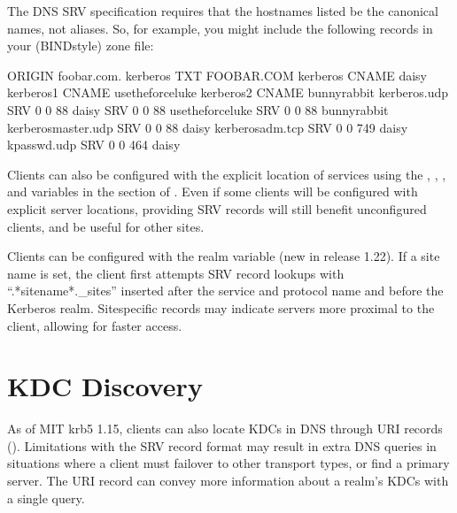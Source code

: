 \documentclass[letterpaper,10pt,english]{sphinxmanual}
\begin{document}
\sphinxAtStartPar
The DNS SRV specification requires that the hostnames listed be the
canonical names, not aliases.  So, for example, you might include the
following records in your (BIND\sphinxhyphen{}style) zone file:

\begin{sphinxVerbatim}[commandchars=\\\{\}]
\PYGZdl{}ORIGIN foobar.com.
\PYGZus{}kerberos               TXT       \PYGZdq{}FOOBAR.COM\PYGZdq{}
kerberos                CNAME     daisy
kerberos\PYGZhy{}1              CNAME     use\PYGZhy{}the\PYGZhy{}force\PYGZhy{}luke
kerberos\PYGZhy{}2              CNAME     bunny\PYGZhy{}rabbit
\PYGZus{}kerberos.\PYGZus{}udp          SRV       0 0 88 daisy
                        SRV       0 0 88 use\PYGZhy{}the\PYGZhy{}force\PYGZhy{}luke
                        SRV       0 0 88 bunny\PYGZhy{}rabbit
\PYGZus{}kerberos\PYGZhy{}master.\PYGZus{}udp   SRV       0 0 88 daisy
\PYGZus{}kerberos\PYGZhy{}adm.\PYGZus{}tcp      SRV       0 0 749 daisy
\PYGZus{}kpasswd.\PYGZus{}udp           SRV       0 0 464 daisy
\end{sphinxVerbatim}

\sphinxAtStartPar
Clients can also be configured with the explicit location of services
using the , , , and
 variables in the {\hyperref[\detokenize{admin/conf_files/krb5_conf:realms}]{}} section of
{\hyperref[\detokenize{admin/conf_files/krb5_conf:krb5-conf-5}]{}}.  Even if some clients will be configured with
explicit server locations, providing SRV records will still benefit
unconfigured clients, and be useful for other sites.

\sphinxAtStartPar
Clients can be configured with the  realm variable (new in
release 1.22).  If a site name is set, the client first attempts SRV
record lookups with “.*sitename*.\_sites” inserted after the service
and protocol name and before the Kerberos realm.  Site\sphinxhyphen{}specific
records may indicate servers more proximal to the client, allowing for
faster access.


\section{KDC Discovery}
\label{\detokenize{admin/realm_config:kdc-discovery}}\label{\detokenize{admin/realm_config:id1}}
\sphinxAtStartPar
As of MIT krb5 1.15, clients can also locate KDCs in DNS through URI
records ().  Limitations with the SRV record format may
result in extra DNS queries in situations where a client must failover
to other transport types, or find a primary server.  The URI record
can convey more information about a realm’s KDCs with a single query.
\end{document}
